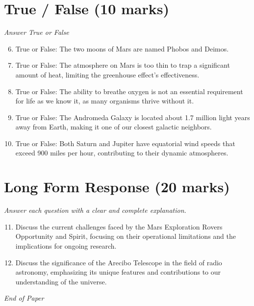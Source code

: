 \documentclass[12pt]{article}
\begin{document}
\section*{True / False (10 marks)}
\textit{Answer True or False}
\begin{enumerate}[label=\arabic*.]
\setcounter{enumi}{5}
\item True or False: The two moons of Mars are named Phobos and Deimos.
\item True or False: The atmosphere on Mars is too thin to trap a significant amount of heat, limiting the greenhouse effect's effectiveness.
\item True or False: The ability to breathe oxygen is not an essential requirement for life as we know it, as many organisms thrive without it.
\item True or False: The Andromeda Galaxy is located about 1.7 million light years away from Earth, making it one of our closest galactic neighbors.
\item True or False: Both Saturn and Jupiter have equatorial wind speeds that exceed 900 miles per hour, contributing to their dynamic atmospheres.
\end{enumerate}

\section*{Long Form Response (20 marks)}
\textit{Answer each question with a clear and complete explanation.}
\begin{enumerate}[label=\arabic*.]
\setcounter{enumi}{10}
\item Discuss the current challenges faced by the Mars Exploration Rovers Opportunity and Spirit, focusing on their operational limitations and the implications for ongoing research.
\item Discuss the significance of the Arecibo Telescope in the field of radio astronomy, emphasizing its unique features and contributions to our understanding of the universe.
\end{enumerate}

\vfill
\noindent\textit{End of Paper}
\end{document}
